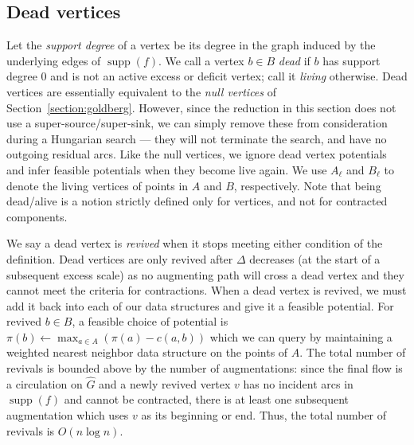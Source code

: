 \documentclass[a4paper,UKenglish]{socg-lipics-v2018}
\def\abs#1{\mathopen| #1 \mathclose|}		%
\def\arcto{\mathord\shortrightarrow}
\def\arc#1#2{#1\arcto#2}
\def\supp{\operatorname{supp}}
\theoremstyle{plain}
\numberwithin{figure}{section}
\def\EMPH#1{\textcolor{BrickRed}{{\emph{#1}}}}
\begin{document}
\begin{toappendix}
\subsection{Dead vertices}
\label{SSA:dead-vertices}

Let the \EMPH{support degree} of a vertex be its degree in the graph induced by the underlying edges of $\supp(f)$.
We call a vertex $b \in B$ \EMPH{dead} if $b$ has support degree $0$ and is not an
active excess or deficit vertex; call it \EMPH{living} otherwise.
Dead vertices are essentially equivalent to the \emph{null vertices} of
Section~\ref{section:goldberg}.
However, since the reduction in this section does not use a super-source/super-sink,
we can simply remove these from consideration during a Hungarian search ---
they will not terminate the search, and have no outgoing residual arcs.
Like the null vertices, we ignore dead vertex potentials and infer feasible
potentials when they become live again.
We use \EMPH{$A_\ell$} and \EMPH{$B_\ell$} to denote the living
vertices of points in $A$ and $B$, respectively.
Note that being dead/alive is a notion strictly defined only for vertices, and not for
contracted components.

We say a dead vertex is \EMPH{revived} when it stops meeting either condition
of the definition.
Dead vertices are only revived after $\Delta$ decreases (at the start of a
subsequent excess scale) as no augmenting path will cross a dead vertex and
they cannot meet the criteria for contractions.
When a dead vertex is revived, we must add it back into each of our data
structures and give it a feasible potential.
For revived $b \in B$, a feasible choice of potential is
$\pi(b) \gets \max_{a \in A} (\pi(a) - c(a, b))$ which we can query by
maintaining a weighted nearest neighbor data structure on the points of $A$.
The total number of revivals is bounded above by the number of augmentations:
since the final flow is a circulation on $\hat{G}$ and a newly revived vertex
$v$ has no incident arcs in $\supp(f)$ and cannot be contracted, there is at least
one subsequent augmentation which uses $v$ as its beginning or end.
Thus, the total number of revivals is $O(n\log n)$.

\end{toappendix}
\end{document}
